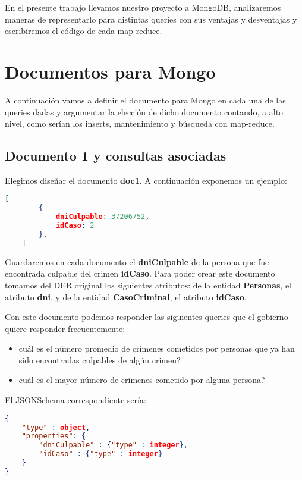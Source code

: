 \documentclass[11pt, a4paper]{article}
\begin{document}
En el presente trabajo llevamos nuestro proyecto a MongoDB, analizaremos maneras de representarlo para distintas queries con sus ventajas y desventajas y escribiremos el c\'odigo de cada map-reduce.

\section{Documentos para Mongo}

A continuaci\'on vamos a definir el documento para Mongo en cada una de las queries dadas y argumentar la elecci\'on de dicho documento contando, a alto nivel, como ser\'ian los inserts, mantenimiento y búsqueda con map-reduce.

\subsection{Documento 1 y consultas asociadas}

Elegimos diseñar el documento \textbf{doc1}. A continuación exponemos un ejemplo: 

\begin{lstlisting}[language=json]
	[
		{
			dniCulpable: 37206752,
			idCaso: 2
		},
	]
\end{lstlisting}

Guardaremos en cada documento el \textbf{dniCulpable} de la persona que fue encontrada culpable del crimen \textbf{idCaso}. Para poder crear este documento tomamos del DER original los siguientes atributos: de la entidad \textbf{Personas}, el atributo \textbf{dni}, y de la entidad \textbf{CasoCriminal}, el atributo \textbf{idCaso}. \

Con este documento podemos responder las siguientes queries que el gobierno quiere responder frecuentemente:
\begin{itemize}
	\item cuál es el número promedio de crímenes cometidos por personas que ya han sido encontradas culpables de algún crimen?
	\item cuál es el mayor número de crímenes cometido por alguna persona?
\end{itemize}

El JSONSchema correspondiente sería:
\begin{lstlisting}[language=json]
{
	"type" : object,
	"properties": {
		"dniCulpable" : {"type" : integer},
		"idCaso" : {"type" : integer}
	}
}
\end{lstlisting}
\end{document}
